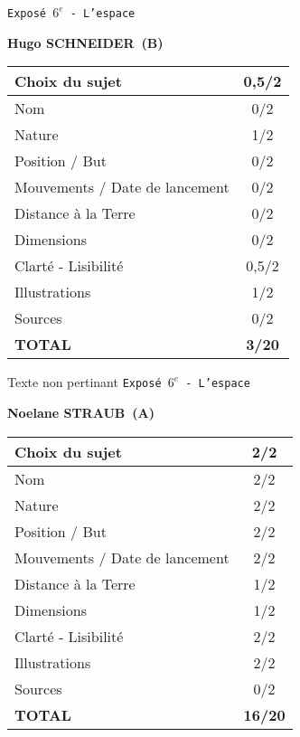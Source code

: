 	\vspace*{1cm}
	
	\newpage
	\LARGE{\texttt{Expos\'e $6^e$ - L'espace}}
	\vspace*{1cm}

	\textbf{Hugo SCHNEIDER\ (B)}

	\vspace*{1.5cm}
	\begin{tabular}{|l|c|}
		\hline
		Choix du sujet & 0,5/2 \\
		\hline
		Nom & 0/2 \\
		\hline
		Nature & 1/2 \\
		\hline
		Position / But & 0/2 \\
		\hline
		Mouvements / Date de lancement & 0/2 \\
		\hline
		Distance \`a la Terre & 0/2 \\
		\hline
		Dimensions & 0/2 \\
		\hline
		Clart\'e - Lisibilit\'e & 0,5/2 \\
		\hline
		Illustrations & 1/2 \\
		\hline
		Sources & 0/2 \\
		\hline
		\textbf{TOTAL}  & \textbf{3/20} \\
		\hline
	\end{tabular}

	\vspace*{1cm}
	Texte non pertinant
	\newpage
	\LARGE{\texttt{Expos\'e $6^e$ - L'espace}}
	\vspace*{1cm}

	\textbf{Noelane STRAUB\ (A)}

	\vspace*{1.5cm}
	\begin{tabular}{|l|c|}
		\hline
		Choix du sujet & 2/2 \\
		\hline
		Nom & 2/2 \\
		\hline
		Nature & 2/2 \\
		\hline
		Position / But & 2/2 \\
		\hline
		Mouvements / Date de lancement & 2/2 \\
		\hline
		Distance \`a la Terre & 1/2 \\
		\hline
		Dimensions & 1/2 \\
		\hline
		Clart\'e - Lisibilit\'e & 2/2 \\
		\hline
		Illustrations & 2/2 \\
		\hline
		Sources & 0/2 \\
		\hline
		\textbf{TOTAL}  & \textbf{16/20} \\
		\hline
	\end{tabular}


